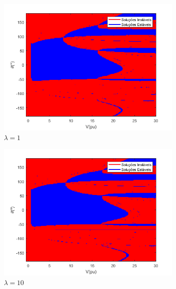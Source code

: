 \clearpage
\begin{figure}[H]
    \centering
    \caption{Mapa Fractal FPPOL - IEEE 14 Barras}
    \begin{subfigure}[b]{0.45\textwidth}
        \centering
        \includegraphics[width=\textwidth]{textuais/capitulo4/figuras/fp_pol_nom.png}
        \caption{$\lambda=1$}
    \end{subfigure}
    \vfill
    \begin{subfigure}[b]{0.45\textwidth}
        \centering
        \includegraphics[width=\textwidth]{textuais/capitulo4/figuras/FP_POL_10lambda.png}
        \caption{$\lambda=10$}
    \end{subfigure}
    \vfill
    \begin{subfigure}[b]{0.45\textwidth}

\end{subfigure}
\end{figure}
